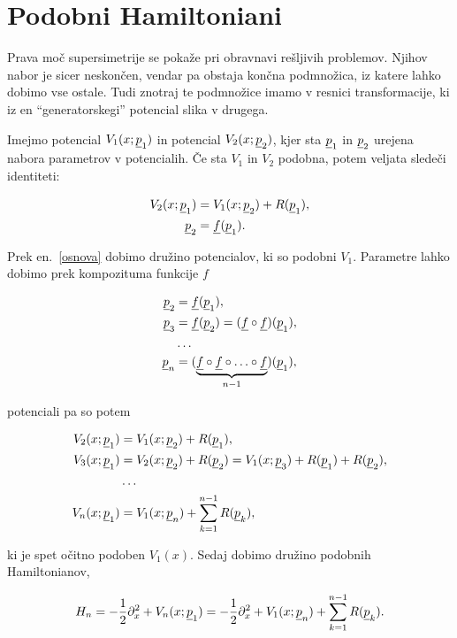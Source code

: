 \section{Podobni Hamiltoniani}

Prava mo\v c supersimetrije se poka\v ze pri obravnavi re\v sljivih problemov. Njihov nabor je sicer neskon\v cen,
vendar pa obstaja kon\v cna podmno\v zica, iz katere lahko dobimo vse ostale. Tudi znotraj te podmno\v zice imamo
v resnici transformacije, ki iz en "`generatorskegi"' potencial slika v drugega.

Imejmo potencial $V_1 (x; \underline{p}_1)$ in potencial
$V_2 (x; \underline{p}_2)$, kjer sta $\underline{p}_1$ in $\underline{p}_2$ urejena nabora parametrov v potencialih. \v Ce sta
$V_1$ in $V_2$ podobna, potem veljata slede\v ci identiteti:

\begin{align}
	V_2 (x; \underline{p}_1) &= V_1 (x; \underline{p}_2) + R (\underline{p}_1), \\
	\underline{p}_2 &= \underline{f} (\underline{p}_1). \label{osnova}
\end{align}

\ni Prek en.~\eqref{osnova} dobimo dru\v zino potencialov, ki so podobni $V_1$. Parametre lahko dobimo prek
kompozituma funkcije $f$

\begin{align}
	\underline{p}_2 &= \underline{f} (\underline{p}_1), \notag \\
	\underline{p}_3 &= \underline{f} (\underline{p}_2) = (\underline{f} \circ \underline{f}) (\underline{p}_1), \notag \\
	&\ldots \notag \\
	\underline{p}_n &= (\underbrace{\underline{f} \circ \underline{f} \circ \ldots \circ \underline{f}}_{n-1}) (\underline{p}_1),
\end{align}

\ni potenciali pa so potem

\begin{align}
	V_2 (x; \underline{p}_1) &= V_1 (x; \underline{p}_2) + R (\underline{p}_1), \notag \\
	V_3 (x; \underline{p}_1) &= V_2 (x; \underline{p}_2) + R (\underline{p}_2) = V_1 (x; \underline{p}_3) + R (\underline{p}_1) + R (\underline{p}_2), \notag \\
	&\ldots \notag \\
	V_n (x; \underline{p}_1) &= V_1 (x; \underline{p}_n) + \sum_{k = 1}^{n-1} R (\underline{p}_k),
\end{align}

\ni ki je spet o\v citno podoben $V_1 (x)$. Sedaj dobimo dru\v zino podobnih Hamiltonianov,

\begin{equation}
	H_n = - \frac{1}{2}\partial_x^2 + V_n (x;\underline{p}_1) = - \frac{1}{2}\partial_x^2+V_1(x;\underline{p}_n)+\sum_{k = 1}^{n-1}R(\underline{p}_k).
\end{equation}

